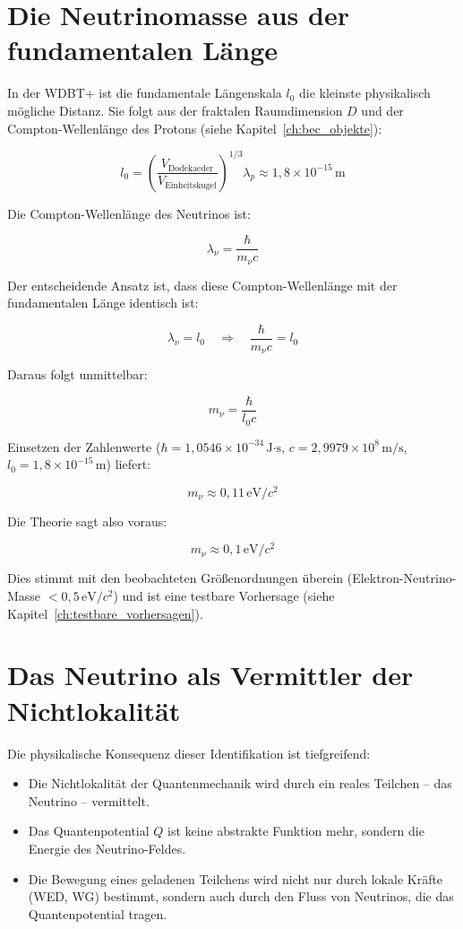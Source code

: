\section{Die Neutrinomasse aus der fundamentalen Länge}
\label{sec:nu_masse}

In der WDBT+ ist die fundamentale Längenskala \( l_0 \) die kleinste physikalisch mögliche Distanz. Sie folgt aus der fraktalen Raumdimension \( D \) und der Compton-Wellenlänge des Protons (siehe Kapitel~\ref{ch:bec_objekte}):

\[
l_0 = \left( \frac{V_{\text{Dodekaeder}}}{V_{\text{Einheitskugel}}} \right)^{1/3} \lambda_p \approx 1,8 \times 10^{-15} \, \text{m}
\]

Die Compton-Wellenlänge des Neutrinos ist:

\[
\lambda_{\nu} = \frac{\hbar}{m_{\nu}c}
\]

Der entscheidende Ansatz ist, dass diese Compton-Wellenlänge mit der fundamentalen Länge identisch ist:

\[
\lambda_{\nu} = l_0 \quad \Rightarrow \quad \frac{\hbar}{m_{\nu}c} = l_0
\]

Daraus folgt unmittelbar:

\[
\boxed{m_{\nu} = \frac{\hbar}{l_0 c}}
\]

Einsetzen der Zahlenwerte (\( \hbar = 1,0546 \times 10^{-34} \, \text{J·s} \), \( c = 2,9979 \times 10^8 \, \text{m/s} \), \( l_0 = 1,8 \times 10^{-15} \, \text{m} \)) liefert:

\[
m_{\nu} \approx 0,11 \, \text{eV}/c^2
\]

Die Theorie sagt also voraus:

\[
m_{\nu} \approx 0,1 \, \text{eV}/c^2
\]

Dies stimmt mit den beobachteten Größenordnungen überein (Elektron-Neutrino-Masse \( < 0,5 \, \text{eV}/c^2 \)) und ist eine testbare Vorhersage (siehe Kapitel~\ref{ch:testbare_vorhersagen}).

\section{Das Neutrino als Vermittler der Nichtlokalität}
\label{sec:nu_nichtlokalitaet}

Die physikalische Konsequenz dieser Identifikation ist tiefgreifend:

\begin{itemize}
    \item Die Nichtlokalität der Quantenmechanik wird durch ein reales Teilchen – das Neutrino – vermittelt.
    \item Das Quantenpotential \( Q \) ist keine abstrakte Funktion mehr, sondern die Energie des Neutrino-Feldes.
    \item Die Bewegung eines geladenen Teilchens wird nicht nur durch lokale Kräfte (WED, WG) bestimmt, sondern auch durch den Fluss von Neutrinos, die das Quantenpotential tragen.
\end{itemize}

